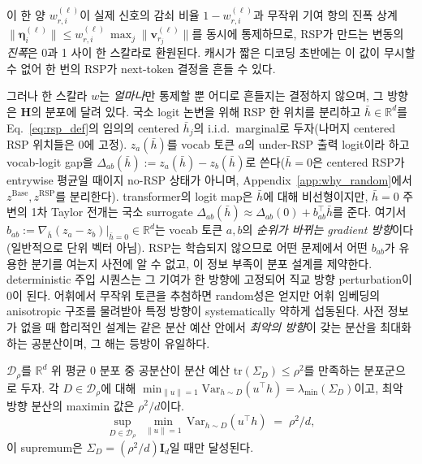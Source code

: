 이 한 양 $w_{r,i}^{(\ell)}$이 실제 신호의 감쇠 비율 $1-w_{r,i}^{(\ell)}$과 무작위 기여 항의 진폭 상계 $\|\boldsymbol{\eta}_i^{(\ell)}\| \le w_{r,i}^{(\ell)}\,\max_j \|\mathbf{v}_{r_j}^{(\ell)}\|$를 동시에 통제하므로, RSP가 만드는 변동의 \emph{진폭}은 0과 1 사이 한 스칼라로 환원된다. 캐시가 짧은 디코딩 초반에는 이 값이 무시할 수 없어 한 번의 RSP가 next-token 결정을 흔들 수 있다.

그러나 한 스칼라 $w$는 \emph{얼마나}만 통제할 뿐 어디로 흔들지는 결정하지 않으며, 그 방향은 $\mathbf{H}$의 분포에 달려 있다. 국소 logit 논변을 위해 RSP 한 위치를 분리하고 $\bar h \in \mathbb{R}^d$를 Eq.~\eqref{eq:rsp_def}의 임의의 centered $\bar h_j$의 i.i.d.\ marginal로 두자(나머지 centered RSP 위치들은 0에 고정). $z_a(\bar h)$를 vocab 토큰 $a$의 under-RSP 출력 logit이라 하고 vocab-logit gap을 $\Delta_{ab}(\bar h) := z_a(\bar h) - z_b(\bar h)$로 쓴다($\bar h = 0$은 centered RSP가 entrywise 평균일 때이지 no-RSP 상태가 아니며, Appendix~\ref{app:why_random}에서 $z^{\text{Base}}, z^{\text{RSP}}$를 분리한다). transformer의 logit map은 $\bar h$에 대해 비선형이지만, $\bar h = 0$ 주변의 1차 Taylor 전개는 국소 surrogate $\Delta_{ab}(\bar h) \approx \Delta_{ab}(0) + b_{ab}^\top \bar h$를 준다. 여기서 $b_{ab} := \nabla_{\bar h}(z_a - z_b)|_{\bar h=0} \in \mathbb{R}^d$는 vocab 토큰 $a, b$의 \emph{순위가 바뀌는 gradient 방향}이다(일반적으로 단위 벡터 아님). RSP는 학습되지 않으므로 어떤 문제에서 어떤 $b_{ab}$가 유용한 분기를 여는지 사전에 알 수 없고, 이 정보 부족이 분포 설계를 제약한다. deterministic 주입 시퀀스는 그 기여가 한 방향에 고정되어 직교 방향 perturbation이 0이 된다. 어휘에서 무작위 토큰을 추첨하면 random성은 얻지만 어휘 임베딩의 anisotropic 구조를 물려받아 특정 방향이 systematically 약하게 섭동된다. 사전 정보가 없을 때 합리적인 설계는 같은 분산 예산 안에서 \emph{최악의 방향}이 갖는 분산을 최대화하는 공분산이며, 그 해는 등방이 유일하다.

\begin{proposition}\label{thm:minimax_directional_coverage}
$\mathcal{D}_\rho$를 $\mathbb{R}^d$ 위 평균 0 분포 중 공분산이 분산 예산 $\mathrm{tr}(\Sigma_D)\le\rho^2$를 만족하는 분포군으로 두자. 각 $D \in \mathcal{D}_\rho$에 대해 $\min_{\|u\|=1}\mathrm{Var}_{h\sim D}(u^\top h) = \lambda_{\min}(\Sigma_D)$이고, 최악 방향 분산의 maximin 값은 $\rho^2/d$이다.
\[
\sup_{D \in \mathcal{D}_\rho} \;\min_{\|u\|=1}\,\mathrm{Var}_{h\sim D}(u^\top h) \;=\; \rho^2/d,
\]
이 supremum은 $\Sigma_D = (\rho^2/d)\mathbf{I}_d$일 때만 달성된다.
\end{proposition}

